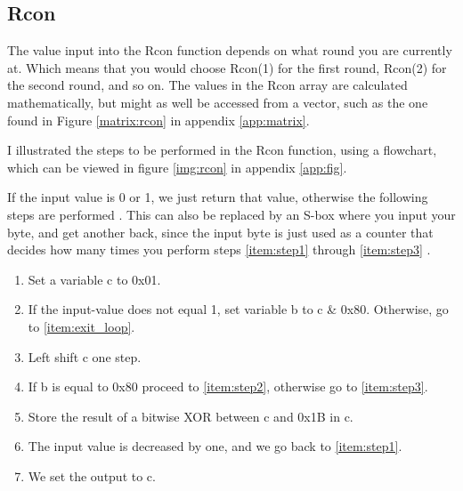 \subsection{Rcon} \label{ch:Rcon}
The value input into the Rcon function depends on what round you are currently 
at. Which means that you would choose Rcon(1) for the first round, Rcon(2) for 
the second round, and so on. The values in the Rcon array are calculated 
mathematically, but might as well be accessed from a vector, such as the one 
found in Figure \ref{matrix:rcon} in appendix \ref{app:matrix}.

I illustrated the steps to be performed in the Rcon function, using a flowchart, 
which can be viewed in figure \ref{img:rcon} in appendix \ref{app:fig}.

If the input value is 0 or 1, we just return that value, otherwise the 
following steps are performed \citep{RijndaelKeySchedule}. This can also be 
replaced by an S-box where you input your byte, and get another back, since the 
input byte is just used as a counter that decides how many times you perform 
steps \ref{item:step1} through \ref{item:step3} 
.

\begin{enumerate}
\item Set a variable c to 0x01.
\item If the input-value does not equal 1, set variable b to c \& 0x80. 
Otherwise, go to \ref{item:exit_loop}. 
\label{item:step1}
\item Left shift c one step.
\item If b is equal to 0x80 proceed to \ref{item:step2}, otherwise go to 
\ref{item:step3}.
\item Store the result of a bitwise XOR between c and 0x1B in c.
\label{item:step2}
\item The input value is decreased by one, and we go back to \ref{item:step1}.
\label{item:step3}
\item We set the output to c.
\label{item:exit_loop}
\end{enumerate}

